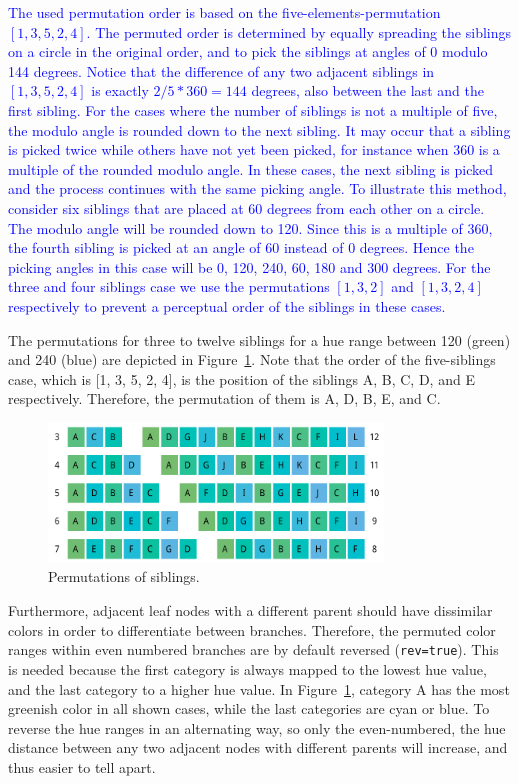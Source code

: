 \documentclass[journal]{vgtc}                %
\newcommand{\changedM}[1]{\textcolor{blue}{#1}}
\begin{document}
\changedM{The used permutation order is based on the five-elements-permutation $[1, 3, 5, 2, 4]$. The permuted order is determined by equally spreading the siblings on a circle in the original order, and to pick the siblings at angles of 0 modulo 144 degrees. Notice that the difference of any two adjacent siblings in $[1, 3, 5, 2, 4]$ is exactly $2/5 * 360=144$ degrees, also between the last and the first sibling. For the cases where the number of siblings is not a multiple of five, the modulo angle is rounded down to the next sibling. It may occur that a sibling is picked twice while others have not yet been picked, for instance when 360 is a multiple of the rounded modulo angle. In these cases, the next sibling is picked and the process continues with the same picking angle. To illustrate this method, consider six siblings that are placed at 60 degrees from each other on a circle. The modulo angle will be rounded down to 120. Since this is a multiple of 360, the fourth sibling is picked at an angle of 60 instead of 0 degrees. Hence the picking angles in this case will be 0, 120, 240, 60, 180 and 300 degrees. For the three and four siblings case we use the permutations $[1, 3, 2]$ and $[1, 3, 2, 4]$ respectively to prevent a perceptual order of the siblings in these cases.}


The permutations for three to twelve siblings for a hue range between 120 (green) and 240 (blue) are depicted in Figure~\ref{fig:perm}. Note that the order of the five-siblings case, which is [1, 3, 5, 2, 4], is the position of the siblings A, B, C, D, and E respectively. Therefore, the permutation of them is A, D, B, E, and C. 

\begin{figure}[tb]
  \centering
  \includegraphics[width=3.5in]{Permutations.pdf}
  \caption{Permutations of siblings.}\label{fig:perm}
\end{figure}

Furthermore, adjacent leaf nodes with a different parent should have dissimilar colors in order to differentiate between branches. Therefore, the permuted color ranges within even numbered branches are by default reversed (\texttt{rev=true}). This is needed because the first category is always mapped to the lowest hue value, and the last category to a higher hue value. In Figure~\ref{fig:perm}, category A has the most greenish color in all shown cases, while the last categories are cyan or blue. To reverse the hue ranges in an alternating way, so only the even-numbered, the hue distance between any two adjacent nodes with different parents will increase, and thus easier to tell apart. 
\end{document}

